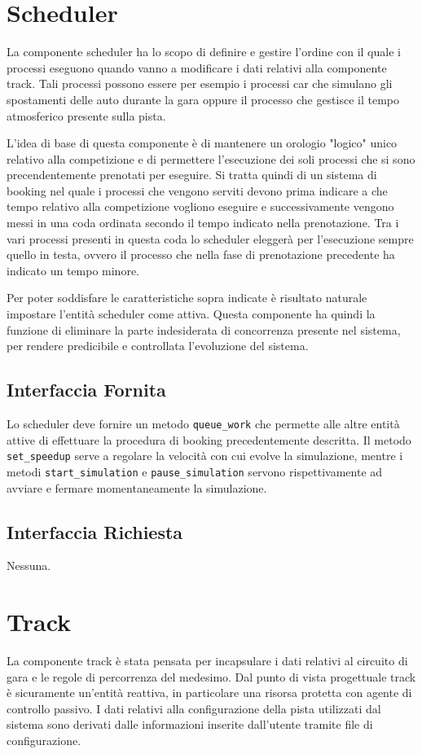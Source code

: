 \documentclass[11pt,a4paper]{report}
\newcommand{\fun}[1]{\texttt{#1}}
\begin{document}
\section{Scheduler}
La componente scheduler ha lo scopo di definire e gestire l'ordine con il quale i processi eseguono quando vanno a modificare i dati relativi alla componente track.
Tali processi possono essere per esempio i processi car che simulano gli spostamenti delle auto durante la gara oppure il processo che gestisce il tempo atmosferico
presente sulla pista.

L'idea di base di questa componente è di mantenere un orologio "logico" unico relativo alla competizione e di permettere l'esecuzione dei soli processi che si sono precendentemente prenotati per eseguire. Si tratta quindi di un sistema di booking nel quale i processi che vengono serviti devono prima indicare a che tempo relativo alla competizione vogliono eseguire e successivamente vengono messi in una coda ordinata secondo il tempo indicato nella prenotazione. Tra i vari processi presenti in questa coda lo scheduler eleggerà per l'esecuzione sempre quello in testa, ovvero il processo che nella fase di prenotazione precedente ha indicato un tempo minore.

Per poter soddisfare le caratteristiche sopra indicate è risultato naturale impostare l'entità scheduler come attiva.
Questa componente ha quindi la funzione di eliminare la parte indesiderata di concorrenza presente nel sistema, per rendere predicibile e controllata l'evoluzione del sistema.
\subsection*{Interfaccia Fornita}
Lo scheduler deve fornire un metodo \fun{queue\_work} che permette alle altre entità attive di effettuare la procedura di booking precedentemente descritta.
Il metodo \fun{set\_speedup} serve a regolare la velocità con cui evolve la simulazione, mentre i metodi \fun{start\_simulation} e \fun{pause\_simulation} servono rispettivamente ad avviare e fermare momentaneamente la simulazione.
\subsection*{Interfaccia Richiesta}
Nessuna.

\section{Track}
La componente track è stata pensata per incapsulare i dati relativi al circuito di gara e le regole di percorrenza del medesimo. Dal punto di vista progettuale track è sicuramente un'entità reattiva, in particolare una risorsa protetta con agente di controllo passivo.
I dati relativi alla configurazione della pista utilizzati dal sistema sono derivati dalle informazioni inserite dall'utente tramite file di configurazione.
\end{document}
